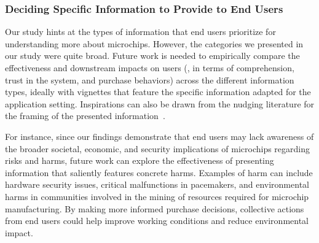 \subsubsection{Deciding Specific Information to Provide to End Users}
\label{subsubsec:info-to-provide}
Our study hints at the types of information that end users prioritize for understanding more about microchips.
However, the categories we presented in our study were quite broad. 
Future work is needed to empirically compare the effectiveness and downstream impacts on users (\eg, in terms of comprehension, trust in the system, and purchase behaviors) across the different information types, ideally with vignettes that feature the specific information adapted for the application setting.
Inspirations can also be drawn from the nudging literature for the framing of the presented information~\cite{acquisti2017nudges}. 

For instance, since our findings demonstrate that end users may lack awareness of the broader societal, economic, and security implications of microchips regarding risks and harms, future work can explore the effectiveness of presenting information that saliently features concrete harms.
Examples of harm can include hardware security issues, critical malfunctions in pacemakers, and environmental harms in communities involved in the mining of resources required for microchip manufacturing.
By making more informed purchase decisions, collective actions from end users could help improve working conditions and reduce environmental impact.


